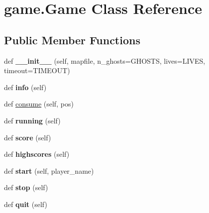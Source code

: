 \hypertarget{classgame_1_1_game}{}\section{game.\+Game Class Reference}
\label{classgame_1_1_game}
\subsection*{Public Member Functions}
\begin{DoxyCompactItemize}
\item 
\mbox{\label{classgame_1_1_game_a636e858f6903da03b5bf816db589b0f4}} 
def {\bfseries \+\_\+\+\_\+init\+\_\+\+\_\+} (self, mapfile, n\+\_\+ghosts=G\+H\+O\+S\+TS, lives=L\+I\+V\+ES, timeout=T\+I\+M\+E\+O\+UT)
\item 
\mbox{\label{classgame_1_1_game_ad71f50e1235ec080b0ae6e5f602d6431}} 
def {\bfseries info} (self)
\item 
def \hyperlink{classgame_1_1_game_aa6fee1ef0d9559a469a2fe3de270cceb}{consume} (self, pos)
\item 
\mbox{\label{classgame_1_1_game_aae8b8e1bfac5b8b3d92bdbdbc546d00b}} 
def {\bfseries running} (self)
\item 
\mbox{\label{classgame_1_1_game_ac11cfa01e84c659b8d1f4a327d62dc8b}} 
def {\bfseries score} (self)
\item 
\mbox{\label{classgame_1_1_game_adb46d77de49891709c4a5474499f552b}} 
def {\bfseries highscores} (self)
\item 
\mbox{\label{classgame_1_1_game_a09039dbddfcbbf31800872cd68605367}} 
def {\bfseries start} (self, player\+\_\+name)
\item 
\mbox{\label{classgame_1_1_game_ab45ee15829722de4c28d64abd9677bab}} 
def {\bfseries stop} (self)
\item 
\mbox{\label{classgame_1_1_game_a2ff36b04f5247f67d37b15367926d85f}} 
def {\bfseries quit} (self)
\item 
\mbox{\label{classgame_1_1_game_a88cc743fa0baebfdf95c79c2492e0251}} 

\end{DoxyCompactItemize}
